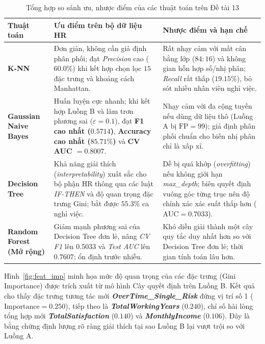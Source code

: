 \begin{table}[H]
\caption{Tổng hợp so sánh ưu, nhược điểm của các thuật toán trên Đề tài 13}
\label{tab:so-sanh-thuat-toan}
\noindent
\begin{tabularx}{\textwidth}{|L{3.1cm}|Y|Y|}
\hline
\textbf{Thuật toán} & \textbf{Ưu điểm trên bộ dữ liệu HR} & \textbf{Nhược điểm và hạn chế} \\
\hline
\textbf{K-NN} & Đơn giản, không cần giả định phân phối; đạt \textit{Precision} cao ($60.0\%$) khi kết hợp chọn lọc $15$ đặc trưng và khoảng cách Manhattan. & Rất nhạy cảm với mất cân bằng lớp ($84:16$) và không gian hỗn hợp số/nhị phân; \textit{Recall} rất thấp ($19.15\%$), bỏ sót nhiều nhân viên nghỉ việc. \\
\hline
\textbf{Gaussian Naive Bayes} & Huấn luyện cực nhanh; khi kết hợp Luồng B và làm trơn phương sai ($\varepsilon = 0.1$), đạt \textbf{F1 cao nhất ($0.5714$)}, \textbf{Accuracy cao nhất ($85.71\%$)} và \textbf{CV AUC $= 0.8007$}. & Nhạy cảm với đa cộng tuyến nếu dùng dữ liệu thô (Luồng A bị $\text{FP}=99$); giả định phân phối chuẩn cho biến nhị phân chỉ là xấp xỉ. \\
\hline
\textbf{Decision Tree} & Khả năng giải thích (\textit{interpretability}) xuất sắc cho bộ phận HR thông qua các luật \textit{IF-THEN} và độ quan trọng đặc trưng Gini; bắt được $55.3\%$ ca nghỉ việc. & Dễ bị quá khớp (\textit{overfitting}) nếu không giới hạn \textit{max\_depth}; biên quyết định vuông góc từng trục nên độ chính xác xác suất thấp hơn ($\text{AUC}=0.7033$). \\
\hline
\textbf{Random Forest (Mở rộng)} & Giảm mạnh phương sai của Decision Tree đơn lẻ, nâng \textit{CV F1} lên $0.5033$ và \textit{Test AUC} lên $0.7607$; ổn định trước nhiễu. & Khó diễn giải thành một cây quy tắc duy nhất hơn so với Decision Tree đơn lẻ; thời gian tính toán lâu hơn. \\
\hline
\end{tabularx}
\end{table}

Hình~\ref{fig:feat_imp} minh họa mức độ quan trọng của các đặc trưng (Gini Importance) được trích xuất từ mô hình Cây quyết định trên Luồng B. Kết quả cho thấy đặc trưng tương tác mới \textbf{\textit{OverTime\_Single\_Risk}} đứng vị trí số 1 ($\text{Importance} = 0.250$), tiếp theo là \textbf{\textit{TotalWorkingYears}} ($0.240$), chỉ số hài lòng tổng hợp mới \textbf{\textit{TotalSatisfaction}} ($0.140$) và \textbf{\textit{MonthlyIncome}} ($0.106$). Đây là bằng chứng định lượng rõ ràng giải thích tại sao Luồng B lại vượt trội so với Luồng A.

